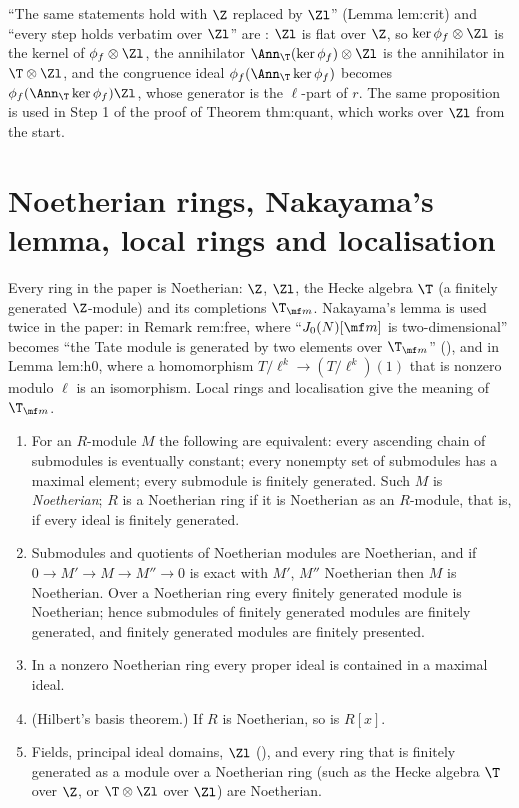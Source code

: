 \begin{paperlink}\label{pl:modules:flat}
``The same statements hold with $\Z$ replaced by $\Zl$'' (Lemma lem:crit) and ``every step holds verbatim over $\Zl$'' are
: $\Zl$ is flat over $\Z$, so $\ker\phi_f\otimes\Zl$ is the kernel of $\phi_f\otimes\Zl$, the annihilator
$\Ann_\T(\ker\phi_f)\otimes\Zl$ is the annihilator in $\T\otimes\Zl$, and the congruence ideal $\phi_f(\Ann_\T\ker\phi_f)$ becomes
$\phi_f(\Ann_\T\ker\phi_f)\Zl$, whose generator is the $\ell$-part of $r$. The same proposition is used in Step 1 of the proof of
Theorem thm:quant, which works over $\Zl$ from the start.
\end{paperlink}

\section[Noetherian rings, Nakayama, localisation]{Noetherian rings, Nakayama's lemma, local rings and localisation}\label{sec:modules:local}

Every ring in the paper is Noetherian: $\Z$, $\Zl$, the Hecke algebra $\T$ (a finitely generated $\Z$-module) and its
completions $\T_{\mf m}$. Nakayama's lemma is used twice in the paper: in Remark rem:free, where ``$J_0(N)[\mf m]$ is
two-dimensional'' becomes ``the Tate module is generated by two elements over $\T_{\mf m}$'' (),
and in Lemma lem:h0, where a homomorphism $T/\ell^k\to(T/\ell^k)(1)$ that is nonzero modulo $\ell$ is an isomorphism. Local rings
and localisation give the meaning of $\T_{\mf m}$.

\begin{proposition}\label{prop:modules:noetherian}
\begin{enumerate}[label=(\roman*)]
\item For an $R$-module $M$ the following are equivalent: every ascending chain of submodules is eventually constant; every
nonempty set of submodules has a maximal element; every submodule is finitely generated. Such $M$ is \emph{Noetherian}; $R$
is a Noetherian ring if it is Noetherian as an $R$-module, that is, if every ideal is finitely generated.
\item Submodules and quotients of Noetherian modules are Noetherian, and if $0\to M'\to M\to M''\to0$ is exact with $M'$, $M''$
Noetherian then $M$ is Noetherian. Over a Noetherian ring every finitely generated module is Noetherian; hence submodules of
finitely generated modules are finitely generated, and finitely generated modules are finitely presented.
\item In a nonzero Noetherian ring every proper ideal is contained in a maximal ideal.
\item (Hilbert's basis theorem.) If $R$ is Noetherian, so is $R[x]$.
\item Fields, principal ideal domains, $\Zl$ (), and every ring that is finitely generated as a module over a
Noetherian ring (such as the Hecke algebra $\T$ over $\Z$, or $\T\otimes\Zl$ over $\Zl$) are Noetherian.
\end{enumerate}
\end{proposition}

